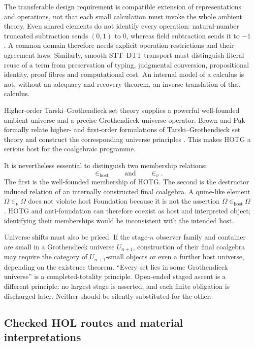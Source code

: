 \documentclass[11pt]{article}
\theoremstyle{definition}
\theoremstyle{remark}
\begin{document}
The transferable design requirement is compatible extension of representations
and operations, not that each small calculation must invoke the whole ambient
theory. Even shared elements do not identify every operation: natural-number
truncated subtraction sends $(0,1)$ to $0$, whereas field subtraction sends it
to $-1$. A common domain therefore needs explicit operation restrictions and
their agreement laws. Similarly, smooth STT--DTT transport must distinguish
literal reuse of a term from preservation of typing, judgmental conversion,
propositional identity, proof fibres and computational cost. An internal model
of a calculus is not, without an adequacy and recovery theorem, an inverse
translation of that calculus.

Higher-order Tarski--Grothendieck set theory supplies a powerful well-founded
ambient universe and a precise Grothendieck-universe operator.  Brown and P\k{a}k
formally relate higher- and first-order formulations of Tarski--Grothendieck set
theory and construct the corresponding universe principles
\cite{BrownPakTwoSetTheories}.  This makes HOTG a serious host for the
coalgebraic programme.

It is nevertheless essential to distinguish two membership relations:
\[
  \in_{\mathrm{host}}
  \qquad\text{and}\qquad
  \in_{\nu}.
\]
The first is the well-founded membership of HOTG.  The second is the destructor
induced relation of an internally constructed final coalgebra.  A quine-like
element $\Omega\in_{\nu}\Omega$ does not violate host Foundation because it is not
the assertion $\Omega\in_{\mathrm{host}}\Omega$.  HOTG and anti-foundation can
therefore coexist as host and interpreted object; identifying their memberships
would be inconsistent with the intended host.

Universe shifts must also be priced.  If the stage-$n$ observer family and
container are small in a Grothendieck universe $U_{n+1}$, construction of their
final coalgebra may require the category of $U_{n+1}$-small objects or even a
further host universe, depending on the existence theorem.  ``Every set lies in
some Grothendieck universe'' is a completed-totality principle.  Open-ended
staged ascent is a different principle: no largest stage is asserted, and each
finite obligation is discharged later.  Neither should be silently substituted
for the other.

\subsection{Checked HOL routes and material interpretations}
\label{sec:checked-hol-material}
\end{document}
